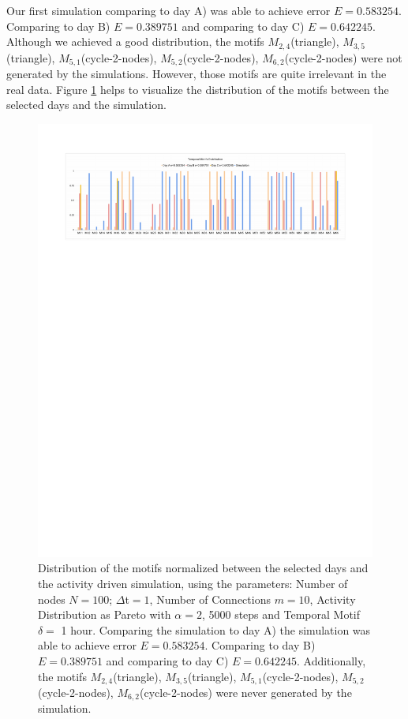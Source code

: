 \documentclass[../../thesis.tex]{subfiles}
\begin{document}
Our first simulation comparing to day A) was able to achieve error $E=0.583254$. Comparing to day B) $E=0.389751$ and comparing to day C) $E=0.642245$. Although we achieved a good distribution, the motifs $M_{2,4}$(triangle), $M_{3,5}$(triangle), $M_{5,1}$(cycle-2-nodes), $M_{5,2}$(cycle-2-nodes), $M_{6,2}$(cycle-2-nodes) were not generated by the simulations. However, those motifs are quite irrelevant in the real data. Figure \ref{fig:all_motifs_golden_vs_simulation_activitydriven} helps to visualize the distribution of the motifs between the selected days and the simulation.

\begin{figure}[H]
\centering
\includegraphics[width=\textwidth]{content/modelling/img/all_motifs_golden_activity_vs_simulation_norm_activitydriven151563604500.pdf}
\caption{Distribution of the motifs normalized between the selected days and the activity driven simulation, using the parameters: Number of nodes $N=100$; $\Delta$t$=1$, Number of Connections $m=10$, Activity Distribution as Pareto with $\alpha=2$, 5000 steps and Temporal Motif $\delta=$ 1 hour. Comparing the simulation to day A) the simulation was able to achieve error $E=0.583254$. Comparing to day B) $E=0.389751$ and comparing to day C) $E=0.642245$. Additionally, the motifs $M_{2,4}$(triangle), $M_{3,5}$(triangle), $M_{5,1}$(cycle-2-nodes), $M_{5,2}$(cycle-2-nodes), $M_{6,2}$(cycle-2-nodes) were never generated by the simulation.}
\label{fig:all_motifs_golden_vs_simulation_activitydriven}
\end{figure}
\end{document}
